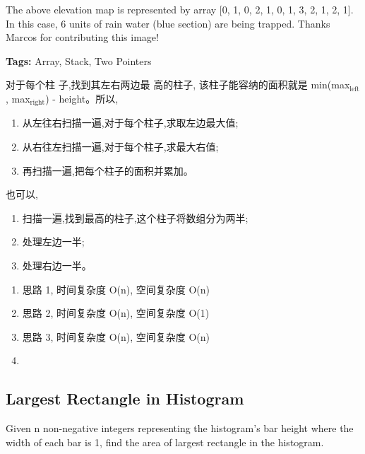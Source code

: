 \documentclass[12pt]{book}
\begin{document}
The above elevation map is represented by array [0, 1, 0, 2, 1, 0, 1, 3, 2, 1, 2, 1]. In this case, 6 units of rain water (blue section) are being trapped. Thanks Marcos for contributing this image!

\textbf{Tags:} Array, Stack, Two Pointers

对于每个柱 子,找到其左右两边最 高的柱子, 该柱子能容纳的面积就是 min(max$_{\text{left}}$, max$_{\text{right}}$) - height。所以,

\begin{enumerate}
\item 从左往右扫描一遍,对于每个柱子,求取左边最大值;
\item 从右往左扫描一遍,对于每个柱子,求最大右值;
\item 再扫描一遍,把每个柱子的面积并累加。
\end{enumerate}
也可以,
\begin{enumerate}
\item 扫描一遍,找到最高的柱子,这个柱子将数组分为两半;
\item 处理左边一半;
\item 处理右边一半。
\end{enumerate}
\begin{enumerate}
\item 思路 1, 时间复杂度 O(n), 空间复杂度 O(n)
\label{sec-5-3-2-1}
\item 思路 2, 时间复杂度 O(n), 空间复杂度 O(1)
\label{sec-5-3-2-2}
\item 思路 3, 时间复杂度 O(n), 空间复杂度 O(n)
\label{sec-5-3-2-3}
\item 
\label{sec-5-3-2-4}
\end{enumerate}
\subsection{Largest Rectangle in Histogram}
\label{sec-5-3-3}
Given n non-negative integers representing the histogram's bar height where the width of each bar is 1, find the area of largest rectangle in the histogram.
\end{document}
